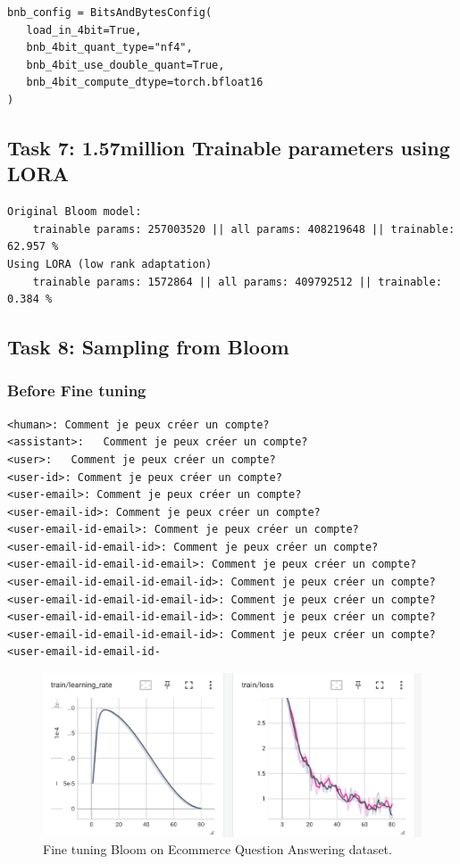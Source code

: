 \documentclass[a4paper]{article}
\begin{document}
\begin{verbatim}
bnb_config = BitsAndBytesConfig(
   load_in_4bit=True,
   bnb_4bit_quant_type="nf4",
   bnb_4bit_use_double_quant=True,
   bnb_4bit_compute_dtype=torch.bfloat16
)
\end{verbatim}

\subsection*{Task 7: 1.57million Trainable parameters using LORA}
\begin{verbatim}
Original Bloom model:
    trainable params: 257003520 || all params: 408219648 || trainable: 62.957 %
Using LORA (low rank adaptation)
    trainable params: 1572864 || all params: 409792512 || trainable: 0.384 %
\end{verbatim}



\subsection*{Task 8: Sampling from Bloom}
\subsubsection*{Before Fine tuning}
\begin{verbatim}
<human>: Comment je peux créer un compte?  
<assistant>:   Comment je peux créer un compte?  
<user>:   Comment je peux créer un compte?  
<user-id>: Comment je peux créer un compte?  
<user-email>: Comment je peux créer un compte?  
<user-email-id>: Comment je peux créer un compte?  
<user-email-id-email>: Comment je peux créer un compte?  
<user-email-id-email-id>: Comment je peux créer un compte?  
<user-email-id-email-id-email>: Comment je peux créer un compte?  
<user-email-id-email-id-email-id>: Comment je peux créer un compte?  
<user-email-id-email-id-email-id>: Comment je peux créer un compte?  
<user-email-id-email-id-email-id>: Comment je peux créer un compte?  
<user-email-id-email-id-email-id>: Comment je peux créer un compte?  
<user-email-id-email-id-
\end{verbatim}


\begin{figure}[ht]
    \centering
    \includegraphics[width=.6\textwidth]{figures/training_finetuning_bloom.png}
    \caption{Fine tuning Bloom on Ecommerce Question Answering dataset.}
    \label{fig:finetuning_bloom}
\end{figure}
\end{document}
